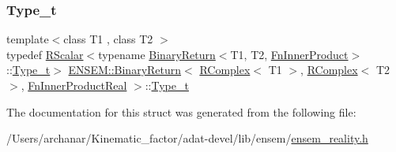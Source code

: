\subsubsection{\texorpdfstring{Type\_t}{Type\_t}\hspace{0.1cm}{\footnotesize\ttfamily [3/3]}}
{\footnotesize\ttfamily template$<$class T1 , class T2 $>$ \\
typedef \mbox{\hyperlink{classENSEM_1_1RScalar}{R\+Scalar}}$<$typename \mbox{\hyperlink{structENSEM_1_1BinaryReturn}{Binary\+Return}}$<$T1, T2, \mbox{\hyperlink{structENSEM_1_1FnInnerProduct}{Fn\+Inner\+Product}}$>$\+::\mbox{\hyperlink{structENSEM_1_1BinaryReturn_3_01RComplex_3_01T1_01_4_00_01RComplex_3_01T2_01_4_00_01FnInnerProductReal_01_4_a37cd0480a2d3d2805d49d50858e6bbad}{Type\+\_\+t}}$>$ \mbox{\hyperlink{structENSEM_1_1BinaryReturn}{E\+N\+S\+E\+M\+::\+Binary\+Return}}$<$ \mbox{\hyperlink{classENSEM_1_1RComplex}{R\+Complex}}$<$ T1 $>$, \mbox{\hyperlink{classENSEM_1_1RComplex}{R\+Complex}}$<$ T2 $>$, \mbox{\hyperlink{structENSEM_1_1FnInnerProductReal}{Fn\+Inner\+Product\+Real}} $>$\+::\mbox{\hyperlink{structENSEM_1_1BinaryReturn_3_01RComplex_3_01T1_01_4_00_01RComplex_3_01T2_01_4_00_01FnInnerProductReal_01_4_a37cd0480a2d3d2805d49d50858e6bbad}{Type\+\_\+t}}}



The documentation for this struct was generated from the following file\+:\begin{DoxyCompactItemize}
\item 
/\+Users/archanar/\+Kinematic\+\_\+factor/adat-\/devel/lib/ensem/\mbox{\hyperlink{adat-devel_2lib_2ensem_2ensem__reality_8h}{ensem\+\_\+reality.\+h}}\end{DoxyCompactItemize}
